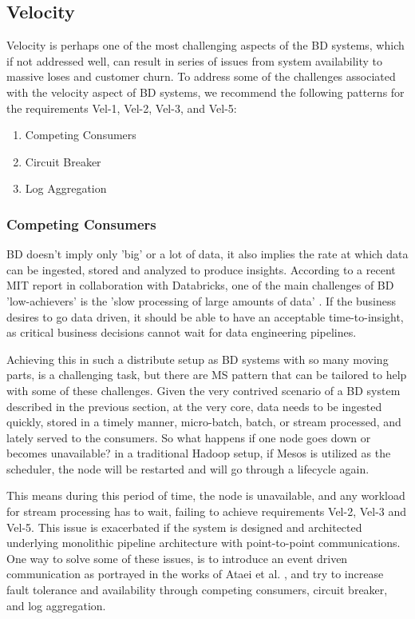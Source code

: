 \documentclass{bmcart}
\begin{document}
\subsection{Velocity}

Velocity is perhaps one of the most challenging aspects of the BD systems, which if not addressed well, can result in series of issues from system availability to massive loses and customer churn. To address some of the challenges associated with the velocity aspect of BD systems, we recommend the following patterns for the requirements Vel-1, Vel-2, Vel-3, and Vel-5:


\begin{enumerate}
  \item Competing Consumers
  \item Circuit Breaker
  \item Log Aggregation
\end{enumerate}


\subsubsection{Competing Consumers}

BD doesn't imply only 'big' or a lot of data, it also implies the rate at which data can be ingested, stored and analyzed to produce insights. According to a recent MIT report in collaboration with Databricks, one of the main challenges of BD 'low-achievers' is the 'slow processing of large amounts of data' \cite{DataBricksSurvey}. If the business desires to go data driven, it should be able to have an acceptable time-to-insight, as critical business decisions cannot wait for data engineering pipelines. 

Achieving this in such a distribute setup as BD systems with so many moving parts, is a challenging task, but there are MS pattern that can be tailored to help with some of these challenges. Given the very contrived scenario of a BD system described in the previous section, at the very core, data needs to be ingested quickly, stored in a timely manner, micro-batch, batch, or stream processed, and lately served to the consumers. So what happens if one node goes down or becomes unavailable? in a traditional Hadoop setup, if Mesos is utilized as the scheduler, the node will be restarted and will go through a lifecycle again. 

This means during this period of time, the node is unavailable, and any workload for stream processing has to wait, failing to achieve requirements Vel-2, Vel-3 and Vel-5. This issue is exacerbated if the system is designed and architected underlying monolithic pipeline architecture with point-to-point communications. One way to solve some of these issues, is to introduce an event driven communication as portrayed in the works of Ataei et al. \cite{ataei2021neomycelia}, and try to increase fault tolerance and availability through competing consumers, circuit breaker, and log aggregation. 
\end{document}
